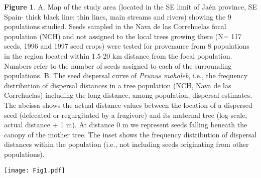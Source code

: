 \documentclass[a4paper,12pt]{article}
\begin{document}
\textbf{Figure 1}. A. Map of the study area (located in the SE limit of Ja\'{e}n province, SE Spain- thick black line; thin lines, main streams and rivers) showing the 9 populations studied. Seeds sampled in the Nava de las Correhuelas focal population (NCH) and not assigned to the local trees growing there (N= 117 seeds, 1996 and 1997 seed crops) were tested for provenance from 8 populations in the region located within 1.5-20 km distance from the focal population. Numbers refer to the number of seeds assigned to each of the surrounding populations. B. The seed dispersal curve of \textit{Prunus mahaleb}, i.e., the frequency distribution of dispersal distances in a tree population (NCH, Nava de las Correhuelas) including the long-distance, among-population, dispersal estimates. The abcissa shows the actual distance values between the location of a dispersed seed (defecated or regurgitated by a frugivore) and its maternal tree (log-scale, actual distance + 1 m). At distance 0 m we represent seeds falling beneath the canopy of the mother tree. The inset shows the frequency distribution of dispersal distances within the population (i.e., not including seeds originating from other populations).\\ 

\begin{sidewaysfigure} 
\centering
\texttt{[image: Fig1.pdf]}
\end{sidewaysfigure}
\end{document}
